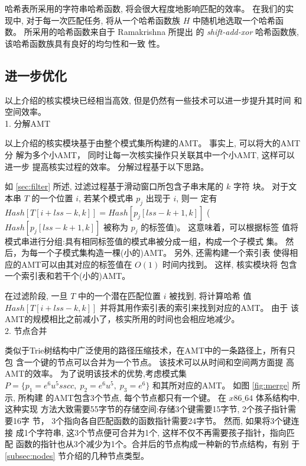 哈希表所采用的字符串哈希函数, 将会很大程度地影响匹配的效率。 在我们的实
现中, 对于每一次匹配任务, 将从一个哈希函数族 $H$ 中随机地选取一个哈希函
数。 所采用的哈希函数来自于 Ramakrishna \cite{Ramakrishna1997} 所提出
的 \emph{shift-add-xor} 哈希函数族, 该哈希函数族具有良好的均匀性和一致
性。

\subsection{进一步优化}
\label{sec:further improments}

以上介绍的核实模块已经相当高效, 但是仍然有一些技术可以进一步提升其时间
和空间效率。\\

1. 分解AMT

以上介绍的核实模块基于由整个模式集所构建的AMT。 事实上, 可以将大的AMT分
解为多个小AMT， 同时让每一次核实操作只关联其中一个小AMT, 这样可以进一步
提高核实过程的效率。 分解过程基于以下思路。

如 \ref{sec:filter} 所述, 过滤过程基于滑动窗口所包含子串末尾的 $k$ 字符
块。 对于文本串 $T$ 的一个位置 $i$, 若某个模式串 $p_j$ 出现于 $i$, 则一
定有 $Hash[T[i+lss-k,k]] = Hash[p_j[lss-k+1,k]]$
($Hash[p_j[lss-k+1,k]]$ 被称为 $p_j$ 的标签值)。 这意味着，可以根据标签
值将模式串进行分组:具有相同标签值的模式串被分成一组，构成一个子模式
集。 然后，为每一个子模式集构造一棵(小的)AMT。 另外, 还需构建一个索引表
使得相应的AMT可以由其对应的标签值在 $O(1)$ 时间内找到。 这样, 核实模块将
包含一个索引表和若干个(小的)AMT。

在过滤阶段, 一旦 $T$ 中的一个潜在匹配位置 $i$ 被找到, 将计算哈希
值 $Hash[T[i+lss-k,k]]$ 并将其用作索引表的索引来找到对应的AMT。 由于
该AMT的规模相比之前减小了，核实所用的时间也会相应地减少。\\

2. 节点合并

类似于Trie树结构中广泛使用的路径压缩技术，在AMT中的一条路径上，所有只包
含一个键的节点可以合并为一个节点。 该技术可以从时间和空间两方面提
高AMT的效率。
为了说明该技术的优势,考虑模式集$P=\{p_1=e^6u^5sscc,\; p_2=e^6u^5,\;
p_3=e^6\}$ 和其所对应的AMT。 如图 \ref{fig:merge} 所示, 所构建
的AMT包含3个节点, 每个节点都只有一个键。 在 $x86\_64$ 体系结构中, 这种实现
方法大致需要55字节的存储空间:存储3个键需要15字节, 2个孩子指针需要16字
节， 3个指向各自匹配函数的函数指针需要24字节。 然而, 如果将3个键连接
成1个字符串, 这3个节点便可合并为1个, 这样不仅不再需要孩子指针，指向匹配
函数的指针也从3个减少为1个。合并后的节点构成一种新的节点结构，有别
于 \ref{subsec:nodes} 节介绍的几种节点类型。

